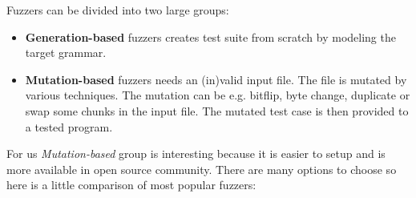 \noindent
Fuzzers can be divided into two large groups:

\begin{itemize}
	\item \textbf{Generation-based} fuzzers creates test suite from scratch by modeling the target grammar.
	\item \textbf{Mutation-based} fuzzers needs an (in)valid input file. The file is mutated by various techniques.
	The mutation can be e.g. bitflip, byte change, duplicate or swap some chunks in the input file.
	The mutated test case is then provided to a tested program.
\end{itemize}

For us \emph{Mutation-based} group is interesting because it is easier to setup and
is more available in open source community. There are many options to choose so here is
a little comparison of most popular fuzzers:

